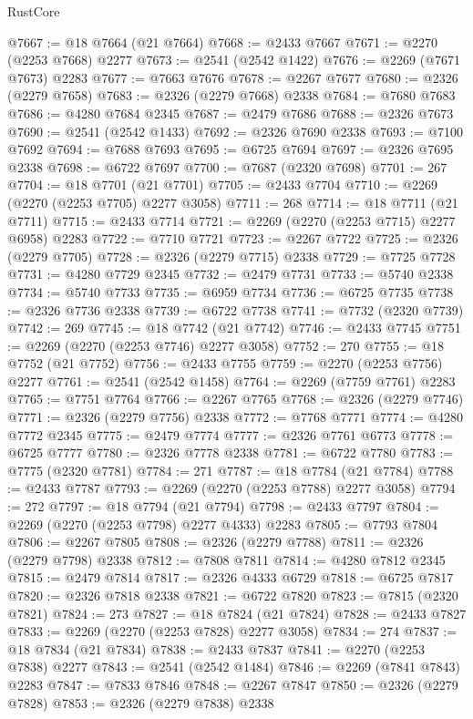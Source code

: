 \begin{lexlean}{RustCore}
\begin{coremodule}
@7667 := @18 @7664 (@21 @7664)
@7668 := @2433 @7667
@7671 := @2270 (@2253 @7668) @2277
@7673 := @2541 (@2542 @1422)
@7676 := @2269 (@7671 @7673) @2283
@7677 := @7663 @7676
@7678 := @2267 @7677
@7680 := @2326 (@2279 @7658)
@7683 := @2326 (@2279 @7668) @2338
@7684 := @7680 @7683
@7686 := @4280 @7684 @2345
@7687 := @2479 @7686
@7688 := @2326 @7673
@7690 := @2541 (@2542 @1433)
@7692 := @2326 @7690 @2338
@7693 := @7100 @7692
@7694 := @7688 @7693
@7695 := @6725 @7694
@7697 := @2326 @7695 @2338
@7698 := @6722 @7697
@7700 := @7687 (@2320 @7698)
@7701 := 267
@7704 := @18 @7701 (@21 @7701)
@7705 := @2433 @7704
@7710 := @2269 (@2270 (@2253 @7705) @2277 @3058)
@7711 := 268
@7714 := @18 @7711 (@21 @7711)
@7715 := @2433 @7714
@7721 := @2269 (@2270 (@2253 @7715) @2277 @6958) @2283
@7722 := @7710 @7721
@7723 := @2267 @7722
@7725 := @2326 (@2279 @7705)
@7728 := @2326 (@2279 @7715) @2338
@7729 := @7725 @7728
@7731 := @4280 @7729 @2345
@7732 := @2479 @7731
@7733 := @5740 @2338
@7734 := @5740 @7733
@7735 := @6959 @7734
@7736 := @6725 @7735
@7738 := @2326 @7736 @2338
@7739 := @6722 @7738
@7741 := @7732 (@2320 @7739)
@7742 := 269
@7745 := @18 @7742 (@21 @7742)
@7746 := @2433 @7745
@7751 := @2269 (@2270 (@2253 @7746) @2277 @3058)
@7752 := 270
@7755 := @18 @7752 (@21 @7752)
@7756 := @2433 @7755
@7759 := @2270 (@2253 @7756) @2277
@7761 := @2541 (@2542 @1458)
@7764 := @2269 (@7759 @7761) @2283
@7765 := @7751 @7764
@7766 := @2267 @7765
@7768 := @2326 (@2279 @7746)
@7771 := @2326 (@2279 @7756) @2338
@7772 := @7768 @7771
@7774 := @4280 @7772 @2345
@7775 := @2479 @7774
@7777 := @2326 @7761 @6773
@7778 := @6725 @7777
@7780 := @2326 @7778 @2338
@7781 := @6722 @7780
@7783 := @7775 (@2320 @7781)
@7784 := 271
@7787 := @18 @7784 (@21 @7784)
@7788 := @2433 @7787
@7793 := @2269 (@2270 (@2253 @7788) @2277 @3058)
@7794 := 272
@7797 := @18 @7794 (@21 @7794)
@7798 := @2433 @7797
@7804 := @2269 (@2270 (@2253 @7798) @2277 @4333) @2283
@7805 := @7793 @7804
@7806 := @2267 @7805
@7808 := @2326 (@2279 @7788)
@7811 := @2326 (@2279 @7798) @2338
@7812 := @7808 @7811
@7814 := @4280 @7812 @2345
@7815 := @2479 @7814
@7817 := @2326 @4333 @6729
@7818 := @6725 @7817
@7820 := @2326 @7818 @2338
@7821 := @6722 @7820
@7823 := @7815 (@2320 @7821)
@7824 := 273
@7827 := @18 @7824 (@21 @7824)
@7828 := @2433 @7827
@7833 := @2269 (@2270 (@2253 @7828) @2277 @3058)
@7834 := 274
@7837 := @18 @7834 (@21 @7834)
@7838 := @2433 @7837
@7841 := @2270 (@2253 @7838) @2277
@7843 := @2541 (@2542 @1484)
@7846 := @2269 (@7841 @7843) @2283
@7847 := @7833 @7846
@7848 := @2267 @7847
@7850 := @2326 (@2279 @7828)
@7853 := @2326 (@2279 @7838) @2338

\end{coremodule}
\end{lexlean}
